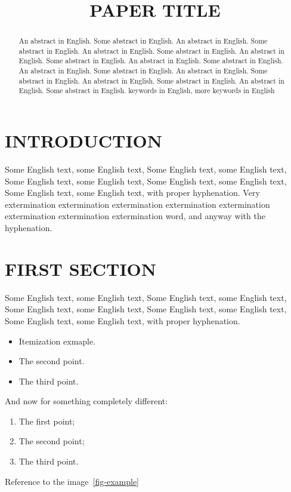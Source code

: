 \documentclass[intlimits,twoside,a4paper,11pt]{article}
\title[Paper title]{PAPER TITLE}
\begin{document}
\maketitle

\begin{abstract}
An abstract in English. Some abstract in English. An abstract in English. Some abstract in English. An abstract in English. Some abstract in English. An abstract in English. Some abstract in English. An abstract in English. Some abstract in English. An abstract in English. Some abstract in English. An abstract in English. Some abstract in English. An abstract in English. Some abstract in English. An abstract in English. Some abstract in English.
\keywords keywords in English, more keywords in English
\end{abstract}

\section{INTRODUCTION}
Some English text, some English text, Some English text, some English text, Some English text, some English text, Some English text, some English text, Some English text, some English text, with proper hyphenation. Very extermination extermination extermination extermination extermination extermination extermination extermination word, and anyway with the hyphenation.

\section{FIRST SECTION}
Some English text, some English text, Some English text, some English text, Some English text, some English text, Some English text, some English text, Some English text, some English text, with proper hyphenation.
\begin{itemize}
\item Itemization exmaple.
\item The second point.
\item The third point.
\end{itemize}

And now for something completely different:
\begin{enumerate}
\item The first point;
\item The second point;
\item The third point.
\end{enumerate}
Reference to the image~\ref{fig-example}
\end{document}
